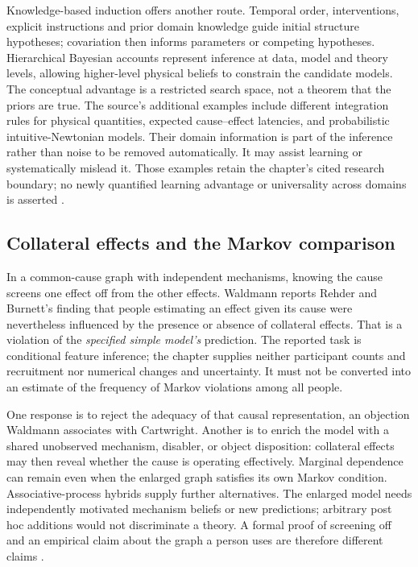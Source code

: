 Knowledge-based induction offers another route. Temporal order,
interventions, explicit instructions and prior domain knowledge guide
initial structure hypotheses; covariation then informs parameters or
competing hypotheses. Hierarchical Bayesian accounts represent inference
at data, model and theory levels, allowing higher-level physical beliefs
to constrain the candidate models. The conceptual advantage is a
restricted search space, not a theorem that the priors are true.
The source's additional examples include different integration rules
for physical quantities, expected cause--effect latencies, and
probabilistic intuitive-Newtonian models. Their domain information is
part of the inference rather than noise to be removed automatically.
It may assist learning or systematically mislead it. Those examples
retain the chapter's cited research boundary; no newly quantified
learning advantage or universality across domains is asserted
\cite[pp.~443--444]{Waldmann2021EverydayCausal}.

\subsection{Collateral effects and the Markov comparison}

In a common-cause graph with independent mechanisms, knowing the cause
screens one effect off from the other effects. Waldmann reports Rehder
and Burnett's finding that people estimating an effect given its cause
were nevertheless influenced by the presence or absence of collateral
effects. That is a violation of the \emph{specified simple model's}
prediction. The reported task is conditional feature inference; the
chapter supplies neither participant counts and recruitment nor
numerical changes and uncertainty. It must not be converted into an
estimate of the frequency of Markov violations among all people.

One response is to reject the adequacy of that causal representation,
an objection Waldmann associates with Cartwright. Another is to enrich
the model with a shared unobserved mechanism, disabler, or object
disposition: collateral effects may then reveal whether the cause is
operating effectively. Marginal dependence can remain even when the
enlarged graph satisfies its own Markov condition. Associative-process
hybrids supply further alternatives. The enlarged model needs
independently motivated mechanism beliefs or new predictions; arbitrary
post hoc additions would not discriminate a theory. A formal proof of
screening off and an empirical claim about the graph a person uses are
therefore different claims
\cite[p.~444]{Waldmann2021EverydayCausal}.

